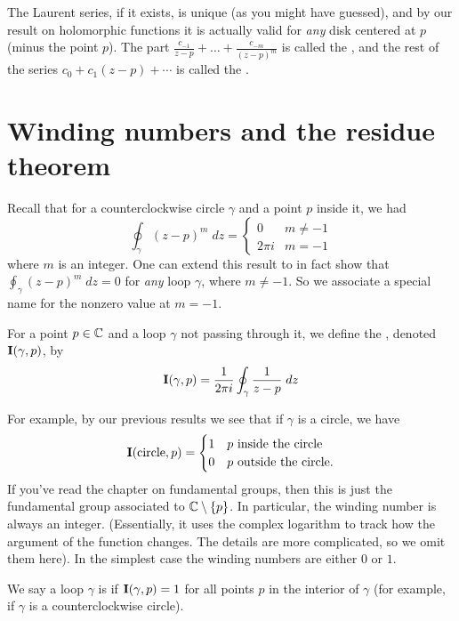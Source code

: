 The Laurent series, if it exists, is unique (as you might have guessed),
and by our result on holomorphic functions it is actually valid for \emph{any}
disk centered at $p$ (minus the point $p$).
The part $\frac{c_{-1}}{z-p} + \dots + \frac{c_{-m}}{(z-p)^m}$ is called the ,
and the rest of the series $c_0 + c_1(z-p) + \dotsb$ is called the .



\section{Winding numbers and the residue theorem}
Recall that for a counterclockwise circle $\gamma$ and a point $p$ inside it, we had
\[
	\oint_{\gamma} (z-p)^m \; dz =
	\begin{cases}
		0 & m \neq -1 \\
		2\pi i & m = -1
	\end{cases}
\]
where $m$ is an integer.
One can extend this result to in fact show that $\oint_\gamma (z-p)^m \; dz = 0$
for \emph{any} loop $\gamma$, where $m \neq -1$.
So we associate a special name for the nonzero value at $m=-1$.
\begin{definition}
	For a point $p \in \mathbb C$ and a loop $\gamma$ not passing through it,
	we define the , denoted $\operatorname{\mathbf I}(\gamma, p)$, by
	\[
		\operatorname{\mathbf I}(\gamma, p) = \frac{1}{2\pi i} \oint_{\gamma} \frac{1}{z-p} \; dz
	\]
\end{definition}
For example, by our previous results we see that if $\gamma$ is a circle, we have
\[
	\operatorname{\mathbf I}(\text{circle}, p)
	=
	\begin{cases}
		1 & \text{$p$ inside the circle} \\
		0 & \text{$p$ outside the circle}.
	\end{cases}
\]
If you've read the chapter on fundamental groups, then this is just the fundamental group
associated to $\mathbb C \setminus \{p\}$.
In particular, the winding number is always an integer.
(Essentially, it uses the complex logarithm to track how the argument of the function changes.
The details are more complicated, so we omit them here).
In the simplest case the winding numbers are either $0$ or $1$.
\begin{definition}
	We say a loop $\gamma$ is  if $\operatorname{\mathbf I}(\gamma, p) = 1$
	for all points $p$ in the interior of $\gamma$ (for example,
	if $\gamma$ is a counterclockwise circle).
\end{definition}

